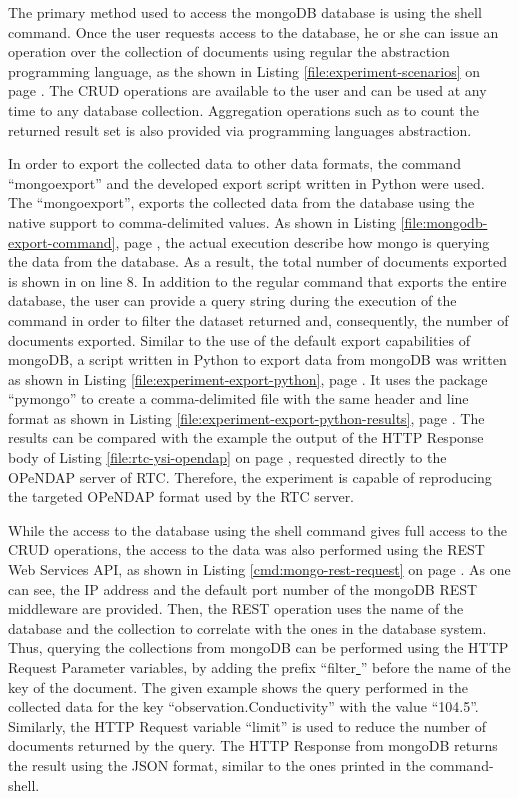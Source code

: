 The primary method used to access the mongoDB database is using the shell
command. Once the user requests access to the database, he or she can issue an
operation over the collection of documents using regular the abstraction
programming language, as the shown in Listing \ref{file:experiment-scenarios}
on page \pageref{file:experiment-scenarios}. The CRUD operations are available
to the user and can be used at any time to any database collection.
Aggregation operations such as to count the returned result set is also
provided via programming languages abstraction.

In order to export the collected data to other data formats, the  command
``mongoexport'' and the developed export script written in Python were used.
The ``mongoexport'', exports the collected data from the database using the
native support to comma-delimited values. As shown in Listing
\ref{file:mongodb-export-command}, page \pageref{file:mongodb-export-command},
the actual execution describe how mongo is querying the data from the
database. As a result, the total number of documents exported is shown in on
line 8. In addition to the regular command that exports the entire database,
the user can provide a query string during the execution of the command in
order to filter the dataset returned and, consequently, the number of
documents exported. Similar to the use of the default export capabilities of
mongoDB, a script written in Python to export data from mongoDB was written as
shown in Listing \ref{file:experiment-export-python}, page
\pageref{file:experiment-export-python}. It uses the package ``pymongo'' to
create a comma-delimited file with the same header and line format as shown in
Listing \ref{file:experiment-export-python-results}, page
\pageref{file:experiment-export-python-results}. The results can be compared
with the example the output of the HTTP Response body of Listing
\ref{file:rtc-ysi-opendap} on page \pageref{file:rtc-ysi-opendap}, requested
directly to the OPeNDAP server of RTC. Therefore, the experiment is capable of
reproducing the targeted OPeNDAP format used by the RTC server.

While the access to the database using the shell command gives full access to 
the CRUD operations, the access to the data was also performed using the REST
Web Services API, as shown in Listing \ref{cmd:mongo-rest-request} on page
\pageref{cmd:mongo-rest-request}. As one can see, the IP address and the
default port number of the mongoDB REST middleware are provided. Then, the
REST operation uses the name of the database and the collection to correlate
with the ones in the database system. Thus, querying the collections from
mongoDB can be performed using the HTTP Request Parameter variables, by adding
the prefix ``filter\underline{ }'' before the name of the key of the document.
The given example shows the query performed in the collected data for the key
``observation.Conductivity'' with the value ``104.5''. Similarly, the HTTP
Request variable ``limit'' is used to reduce the number of documents returned
by the query. The HTTP Response from mongoDB returns the result using the JSON
format, similar to the ones printed in the command-shell.

